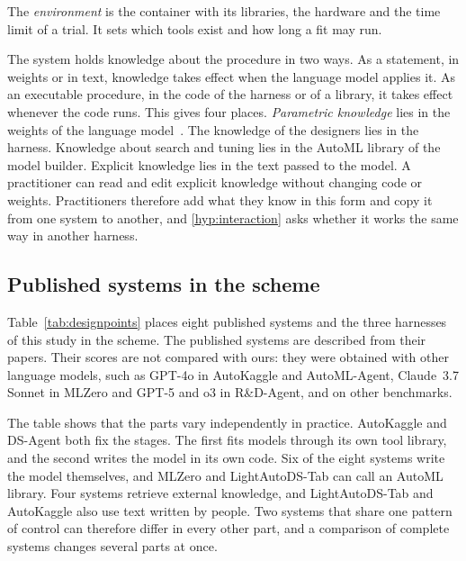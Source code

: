 The \emph{environment} is the container with its libraries, the hardware
and the time limit of a trial. It sets which tools exist and how long a
fit may run.

The system holds knowledge about the procedure in two ways. As a statement,
in weights or in text, knowledge takes effect when the language model
applies it. As an executable procedure, in the code of the harness or of a
library, it takes effect whenever the code runs. This gives four places.
\emph{Parametric knowledge} lies in the weights of the language
model~\citep{lewis2020rag,xu2024conflicts}. The knowledge of the designers
lies in the harness. Knowledge about search and tuning lies in the AutoML
library of the model builder. Explicit knowledge lies in the text passed to
the model. A practitioner can read and edit explicit knowledge without
changing code or weights. Practitioners therefore add what they know in this
form and copy it from one system to another, and \ref{hyp:interaction} asks
whether it works the same way in another harness.

\subsection{Published systems in the scheme}
\label{sec:space}

Table~\ref{tab:designpoints} places eight published systems and the three
harnesses of this study in the scheme. The published systems are described
from their papers. Their scores are not compared with ours: they were
obtained with other language models, such as GPT-4o in AutoKaggle and
AutoML-Agent, Claude~3.7 Sonnet in MLZero and GPT-5 and o3 in R\&D-Agent,
and on other benchmarks.

The table shows that the parts vary independently in practice. AutoKaggle
and DS-Agent both fix the stages. The first fits models through its own
tool library, and the second writes the model in its own code. Six of the
eight systems write the model themselves, and MLZero and LightAutoDS-Tab
can call an AutoML library. Four systems retrieve external knowledge, and
LightAutoDS-Tab and AutoKaggle also use text written by people. Two systems
that share one pattern of control can therefore differ in every other part,
and a comparison of complete systems changes several parts at once.

